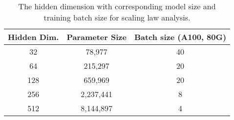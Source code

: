 \begin{table}[]
    \centering
    \caption{The hidden dimension with corresponding model size and training batch size for scaling law analysis.}
    \label{tab:model_size}
    \begin{tabular}{@{}ccc@{}}
    \toprule
    Hidden Dim. & Parameter Size & Batch size (A100, 80G) \\ \midrule
    32          & 78,977         & 40                     \\
    64          & 215,297        & 20                     \\
    128         & 659,969        & 20                     \\
    256         & 2,237,441      & 8                      \\
    512         & 8,144,897      & 4                      \\ \bottomrule
    \end{tabular}%
    \end{table}
